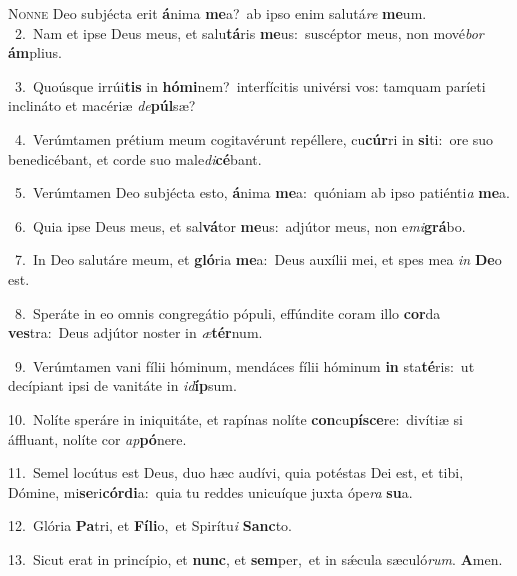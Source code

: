 \lettrine{\initial\textcolor{\initialcolor}{N}}{onne} Deo subjécta erit \textbf{á}\-nima \textbf{me}\-a?~\star ab ipso enim salutá\textit{re} \textbf{me}\-um.\\
{\numbfont\textcolor{\numbcolor}{~2.}}~Nam et ipse Deus meus, et salu\-\textbf{tá}\-ris \textbf{me}\-us:~\star suscéptor meus, non mové\textit{bor} \textbf{ám}\-plius.\par
{\numbfont\textcolor{\numbcolor}{~3.}}~Quoúsque irrúi\textbf{tis} in \textbf{hó}\-\textbf{mi}nem?~\star interfícitis univérsi vos: tamquam paríeti inclináto et macériæ \textit{de}\-\textbf{púl}sæ?\par
{\numbfont\textcolor{\numbcolor}{~4.}}~Verúmtamen prétium meum cogitavérunt repéllere, cu\-\textbf{cúr}\-ri in \textbf{si}\-ti:~\star ore suo benedicébant, et corde suo male\-\textit{di}\-\textbf{cé}bant.\par
{\numbfont\textcolor{\numbcolor}{~5.}}~Verúmtamen Deo subjécta esto, \textbf{á}\-nima \textbf{me}\-a:~\star quóniam ab ipso patiénti\textit{a} \textbf{me}\-a.\par
{\numbfont\textcolor{\numbcolor}{~6.}}~Quia ipse Deus meus, et sal\-\textbf{vá}\-tor \textbf{me}\-us:~\star adjútor meus, non e\-\textit{mi}\-\textbf{grá}bo.\par
{\numbfont\textcolor{\numbcolor}{~7.}}~In Deo salutáre meum, et \textbf{gló}\-ria \textbf{me}\-a:~\star Deus auxílii mei, et spes mea \textit{in} \textbf{De}\-o est.\par
{\numbfont\textcolor{\numbcolor}{~8.}}~Speráte in eo omnis congregátio pópuli, effúndite coram illo \textbf{cor}\-da \textbf{ves}\-tra:~\star Deus adjútor noster in \textit{æ}\-\textbf{tér}num.\par
{\numbfont\textcolor{\numbcolor}{~9.}}~Verúmtamen vani fílii hóminum, mendáces fílii hóminum \textbf{in} sta\-\textbf{té}\-ris:~\star ut decípiant ipsi de vanitáte in \textit{id}\-\textbf{íp}sum.\par
{\numbfont\textcolor{\numbcolor}{10.}}~Nolíte speráre in iniquitáte, et rapínas nolíte \textbf{con}\-cu\-\textbf{pí}\-\textbf{sce}re:~\star divítiæ si áffluant, nolíte cor \textit{ap}\-\textbf{pó}nere.\par
{\numbfont\textcolor{\numbcolor}{11.}}~Semel locútus est Deus, duo hæc audívi, quia potéstas Dei est, et tibi, Dómine, mi\-\textbf{se}\-ri\-\textbf{cór}\-\textbf{di}a:~\star quia tu reddes unicuíque juxta ópe\textit{ra} \textbf{su}\-a.\par
{\numbfont\textcolor{\numbcolor}{12.}}~Glória \textbf{Pa}\-tri, et \textbf{Fí}\-\textbf{li}o,~\star et Spirítu\textit{i} \textbf{Sanc}\-to.\par
{\numbfont\textcolor{\numbcolor}{13.}}~Sicut erat in princípio, et \textbf{nunc}\-, et \textbf{sem}\-per,~\star et in sǽcula sæculó\-\textit{rum}\-. \textbf{A}\-men.\par
